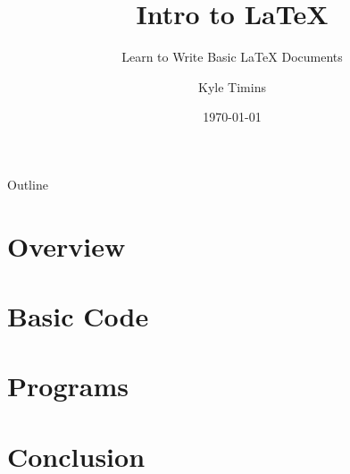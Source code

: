 \documentclass[compress,14pt]{beamer}
\title{Intro to \LaTeX }
\subtitle{Learn to Write Basic \LaTeX{} Documents}
\author{Kyle Timins}
\institute[Vermont Technical College]{Vermont Technical College}
\date{\today{}}
\begin{document}
\begin{frame}
    \titlepage
\end{frame}

\section[Outline]{}
\begin{frame}{Outline}
    \begin{multicols}{2}
        \tableofcontents[hideallsubsections]
    \end{multicols}
\end{frame}

\section{Overview}


\section{Basic Code}


\section{Programs}


\section{Conclusion}

\end{document}
